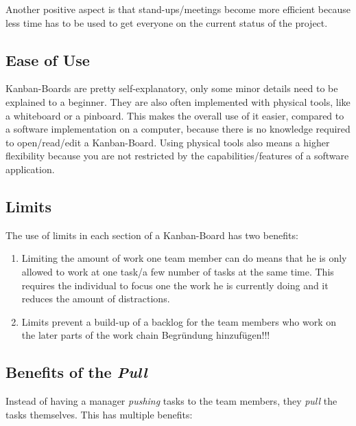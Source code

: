 \documentclass[12pt]{scrartcl}
\newcommand{\be}{\begin{enumerate}}
\newcommand{\ee}{\end{enumerate}}
\begin{document}
			Another positive aspect is that stand-ups/meetings become more efficient because less time has to be used to get everyone on the current status of the project.
			
		\subsection{Ease of Use}
			Kanban-Boards are pretty self-explanatory, only some minor details need to be explained to a beginner. They are also often implemented with physical tools, like a whiteboard or a pinboard. This makes the overall use of it easier, compared to a software implementation on a computer, because there is no knowledge required to open/read/edit a Kanban-Board. Using physical tools also means a higher flexibility because you are not restricted by the capabilities/features of a software application.
			
			
		\subsection{Limits}
			The use of limits in each section of a Kanban-Board has two benefits:
			
			\be
				\item Limiting the amount of work one team member can do means that he is only allowed to work at one task/a few number of tasks at the same time. This requires the individual to focus one the work he is currently doing and it reduces the amount of distractions.
				\item Limits prevent a build-up of a backlog for the team members who work on the later parts of the work chain {\color{red} Begründung hinzufügen!!!}
			\ee
			
		
		\subsection{Benefits of the \textit{Pull}} 
			Instead of having a manager \textit{pushing} tasks to the team members, they \textit{pull} the tasks themselves. This has multiple benefits:
			
\end{document}
